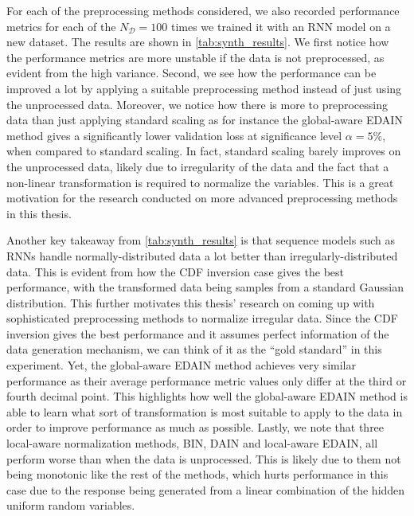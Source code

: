 \documentclass{statsmsc}
\begin{document}
{%
For each of the preprocessing methods considered, we also recorded performance metrics for each
of the $N_{\mathcal{D}}=100$ times we trained it with an \ac{RNN} model on a new dataset.
The results are
shown in \cref{tab:synth_results}. We first notice how the performance metrics are more unstable
if the data is not preprocessed, as evident from the high variance. Second, we see how the
performance can be improved a lot by applying a suitable preprocessing method instead of just
using the unprocessed data. Moreover, we notice how there is more to preprocessing data than just
applying standard scaling as for instance the global-aware \ac{EDAIN} method
gives a significantly lower validation loss at significance level $\alpha=5\%$, when
compared to standard scaling. In fact, standard scaling barely improves on the unprocessed data,
likely due to irregularity of the data and the fact that a non-linear transformation is required
to normalize the variables.  This is a great motivation for the research conducted on more advanced
preprocessing methods in this thesis.

Another key takeaway from \cref{tab:synth_results} is that sequence
models such as \acp{RNN} handle normally-distributed data a lot better than irregularly-distributed
data. This is evident from how the \ac{CDF} inversion case gives the best performance, with the
transformed data being samples from a standard Gaussian distribution. This further motivates this
thesis' research on coming up with sophisticated preprocessing methods to normalize irregular data.
Since the \ac{CDF} inversion gives the best performance and it assumes perfect information of the
data generation mechanism, we can think of it as the ``gold standard'' in this experiment.
Yet, the global-aware \ac{EDAIN} method achieves very similar performance as their
average performance metric values only differ at the third or fourth decimal point. This highlights
how well the global-aware \ac{EDAIN} method is able to learn what sort of transformation
is most suitable to apply to the data in order to improve performance as much as possible.
Lastly, we note that three local-aware normalization methods, \ac{BIN},
\ac{DAIN} and local-aware \ac{EDAIN}, all perform worse than when the data is unprocessed.
This is likely due to them not being monotonic like the rest of the methods,
which hurts performance in this case due to the response being generated from a
linear combination of the hidden uniform random variables.


}
\end{document}
